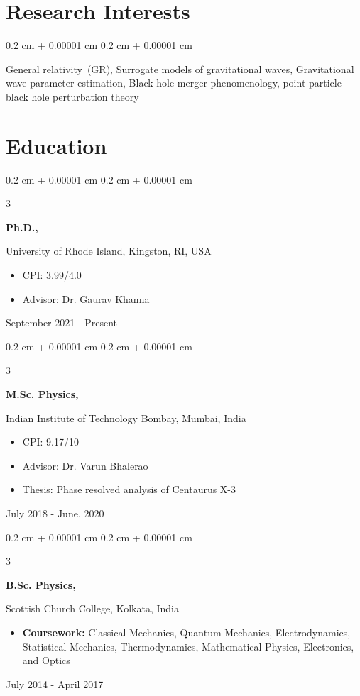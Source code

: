 \documentclass[10pt, letterpaper]{article}
\newenvironment{highlights}{
    \begin{itemize}[
        topsep=0.10 cm,
        parsep=0.10 cm,
        partopsep=0pt,
        itemsep=0pt,
        leftmargin=0.4 cm + 10pt
    ]
}{
    \end{itemize}
}
\newenvironment{onecolentry}{
    \begin{adjustwidth}{
        0.2 cm + 0.00001 cm
    }{
        0.2 cm + 0.00001 cm
    }
}{
    \end{adjustwidth}
}
\newenvironment{threecolentry}[3][]{
    \onecolentry
    \def\thirdColumn{#3}
    \setcolumnwidth{2.5 cm, \fill, 4.5 cm}
    \begin{paracol}{3}
    {\raggedright #2} \switchcolumn
}{
    \switchcolumn \raggedleft \thirdColumn
    \end{paracol}
    \endonecolentry
}
\begin{document}
\vspace{0.3 cm - 0.3 cm}

\section{Research Interests}
  \begin{onecolentry}
    General relativity~(GR), Surrogate models of gravitational waves, Gravitational wave parameter estimation, Black hole merger phenomenology, point-particle black hole perturbation theory
  \end{onecolentry}

\section{Education}
  \begin{threecolentry}{\textbf{Ph.D.,}}{
    September 2021 - Present
  }
    University of Rhode Island, Kingston, RI, USA
    \begin{highlights}
      \item CPI: 3.99/4.0
      \item Advisor: Dr. Gaurav Khanna
    \end{highlights}
  \end{threecolentry}

\begin{threecolentry}{\textbf{M.Sc. Physics,}}{
    July 2018 - June, 2020
  }
    Indian Institute of Technology Bombay, Mumbai, India
  \begin{highlights}
    \item CPI: 9.17/10
    \item Advisor: Dr. Varun Bhalerao
    \item Thesis: Phase resolved analysis of Centaurus X-3
  \end{highlights}
\end{threecolentry} 

\begin{threecolentry}{\textbf{B.Sc. Physics,}}{
  July 2014 - April 2017
}
  Scottish Church College, Kolkata, India
  \begin{highlights}
      \item \textbf{Coursework:} Classical Mechanics, Quantum Mechanics, Electrodynamics, Statistical Mechanics, Thermodynamics, Mathematical Physics, Electronics, and Optics
  \end{highlights}
\end{threecolentry}
\end{document}

